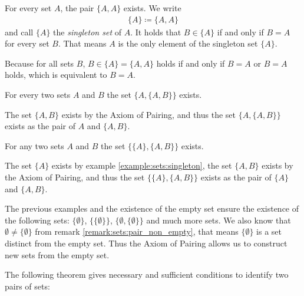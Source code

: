 \begin{examples}
    \begin{exampleenumerate}
        \item\label{example:sets:singleton} For every set $A$, the pair $\{A,A\}$ exists. We write \begin{align}\{A\}\coloneq\{A,A\}\end{align} and call $\{A\}$ the \emph{singleton set} of $A$. It holds that $B\in\{A\}$ if and only if $B=A$ for every set $B$. That means $A$ is the only element of the singleton set $\{A\}$.
        \begin{miniproof}
            Because for all sets $B$, $B\in\{A\}=\{A,A\}$ holds if and only if $B=A$ or $B=A$ holds, which is equivalent to $B=A$.
        \end{miniproof}
        \item For every two sets $A$ and $B$ the set $\{A,\{A,B\}\}$ exists.
        \begin{miniproof}
            The set $\{A,B\}$ exists by the Axiom of Pairing, and thus the set $\{A,\{A,B\}\}$ exists as the pair of $A$ and $\{A,B\}$.
        \end{miniproof}
        \item\label{example:sets:ordered-pairs} For any two sets $A$ and $B$ the set $\{\{A\},\{A,B\}\}$ exists.
        \begin{miniproof}
            The set $\{A\}$ exists by example \ref{example:sets:singleton}, the set $\{A,B\}$ exists by the Axiom of Pairing, and thus the set $\{\{A\},\{A,B\}\}$ exists as the pair of $\{A\}$ and $\{A,B\}$.
        \end{miniproof}
        \item The previous examples and the existence of the empty set ensure the existence of the following sets: $\{\emptyset\}$, $\{\{\emptyset\}\}$, $\{\emptyset,\{\emptyset\}\}$ and much more sets. We also know that $\emptyset\neq\{\emptyset\}$ from remark \ref{remark:sets:pair_non_empty}, that means $\{\emptyset\}$ is a set distinct from the empty set. Thus the Axiom of Pairing allows us to construct new sets from the empty set.
     \end{exampleenumerate}
\end{examples}

The following theorem gives necessary and sufficient conditions to identify two pairs of sets:


